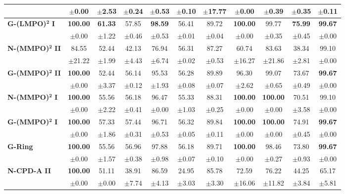 \begin{table}[ht]
\begin{tabular}{lcccccccccc}
 & $\pm$0.00 & $\pm$2.53 & $\pm$0.24 & $\pm$0.53 & $\pm$0.10 & $\pm$17.77 & $\pm$0.00 & $\pm$0.39 & $\pm$0.35 & $\pm$0.11 \\
\midrule
\textbf{G-(LMPO)}$\bm{^2}$ \textbf{I} & \textbf{100.00} & \textbf{61.33} & 57.85 & \textbf{98.59} & 56.41 & 89.72 & \textbf{100.00} & 99.77 & \textbf{75.99} & \textbf{99.67} \\
 & $\pm$0.00 & $\pm$1.22 & $\pm$0.46 & $\pm$0.53 & $\pm$0.01 & $\pm$0.04 & $\pm$0.00 & $\pm$0.35 & $\pm$0.45 & $\pm$0.00 \\
\midrule
\textbf{N-(MMPO)}$\bm{^2}$ \textbf{II} & 84.55 & 52.44 & 42.13 & 76.94 & 56.31 & 87.27 & 60.74 & 83.63 & 38.34 & 99.10 \\
 & $\pm$21.22 & $\pm$1.99 & $\pm$4.43 & $\pm$6.74 & $\pm$0.02 & $\pm$0.53 & $\pm$16.27 & $\pm$21.86 & $\pm$2.81 & $\pm$0.00 \\
\midrule
\textbf{G-(MMPO)}$\bm{^2}$ \textbf{II} & \textbf{100.00} & 52.44 & 56.14 & 95.53 & 56.28 & 89.89 & 96.30 & 99.07 & 73.67 & \textbf{99.67} \\
 & $\pm$0.00 & $\pm$3.37 & $\pm$0.12 & $\pm$1.93 & $\pm$0.08 & $\pm$0.07 & $\pm$2.62 & $\pm$0.65 & $\pm$0.49 & $\pm$0.00 \\
\midrule
\textbf{N-(MMPO)}$\bm{^2}$ \textbf{I} & \textbf{100.00} & 55.56 & 56.18 & 96.47 & 55.33 & 88.31 & \textbf{100.00} & \textbf{100.00} & 70.51 & 99.10 \\
 & $\pm$0.00 & $\pm$2.22 & $\pm$0.41 & $\pm$0.00 & $\pm$1.03 & $\pm$0.25 & $\pm$0.00 & $\pm$0.00 & $\pm$3.58 & $\pm$0.00 \\
\midrule
\textbf{G-(MMPO)}$\bm{^2}$ \textbf{I} & \textbf{100.00} & 57.33 & 57.44 & 96.71 & 56.32 & 89.84 & \textbf{100.00} & \textbf{100.00} & 74.91 & \textbf{99.67} \\
 & $\pm$0.00 & $\pm$1.86 & $\pm$0.31 & $\pm$0.53 & $\pm$0.05 & $\pm$0.11 & $\pm$0.00 & $\pm$0.00 & $\pm$0.45 & $\pm$0.00 \\
\midrule
\textbf{G-Ring} & \textbf{100.00} & 55.56 & 56.96 & 97.88 & 56.18 & 89.71 & \textbf{100.00} & 98.46 & 73.80 & \textbf{99.67} \\
 & $\pm$0.00 & $\pm$1.57 & $\pm$0.38 & $\pm$0.98 & $\pm$0.07 & $\pm$0.10 & $\pm$0.00 & $\pm$0.27 & $\pm$0.93 & $\pm$0.00 \\
\midrule
\midrule
\textbf{N-CPD-A} \textbf{II} & \textbf{100.00} & 51.11 & 38.91 & 86.59 & 24.95 & 85.78 & 72.59 & 76.22 & 44.25 & 65.17 \\
 & $\pm$0.00 & $\pm$0.00 & $\pm$7.74 & $\pm$4.13 & $\pm$3.03 & $\pm$3.30 & $\pm$16.06 & $\pm$11.82 & $\pm$3.84 & $\pm$5.81 \\

\end{tabular}
\end{table}
